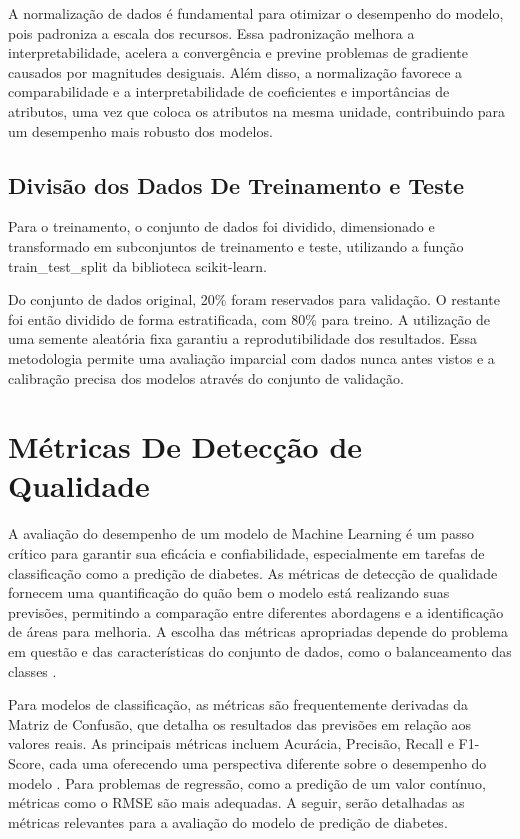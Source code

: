 A normalização de dados é fundamental para otimizar o desempenho do modelo, pois padroniza a escala dos recursos. Essa padronização melhora a interpretabilidade, acelera a convergência e previne problemas de gradiente causados por magnitudes desiguais. Além disso, a normalização favorece a comparabilidade e a interpretabilidade de coeficientes e importâncias de atributos, uma vez que coloca os atributos na mesma unidade, contribuindo para um desempenho mais robusto dos modelos.

\subsection{Divisão dos Dados De Treinamento e Teste}
Para o treinamento, o conjunto de dados foi dividido, dimensionado e transformado em subconjuntos de treinamento e teste, utilizando a função train\_test\_split da biblioteca scikit-learn.

Do conjunto de dados original, 20\% foram reservados para validação. O restante foi então dividido de forma estratificada, com 80\% para treino. A utilização de uma semente aleatória fixa garantiu a reprodutibilidade dos resultados. Essa metodologia permite uma avaliação imparcial com dados nunca antes vistos e a calibração precisa dos modelos através do conjunto de validação. 


\section{Métricas De Detecção de Qualidade}
A avaliação do desempenho de um modelo de Machine Learning é um passo crítico para garantir sua eficácia e confiabilidade, especialmente em tarefas de classificação como a predição de diabetes. As métricas de detecção de qualidade fornecem uma quantificação do quão bem o modelo está realizando suas previsões, permitindo a comparação entre diferentes abordagens e a identificação de áreas para melhoria. A escolha das métricas apropriadas depende do problema em questão e das características do conjunto de dados, como o balanceamento das classes \cite{Han2012, Bishop2006}.

Para modelos de classificação, as métricas são frequentemente derivadas da Matriz de Confusão, que detalha os resultados das previsões em relação aos valores reais. As principais métricas incluem Acurácia, Precisão, Recall e F1-Score, cada uma oferecendo uma perspectiva diferente sobre o desempenho do modelo \cite{Freitas2024}. Para problemas de regressão, como a predição de um valor contínuo, métricas como o RMSE são mais adequadas. A seguir, serão detalhadas as métricas relevantes para a avaliação do modelo de predição de diabetes.

